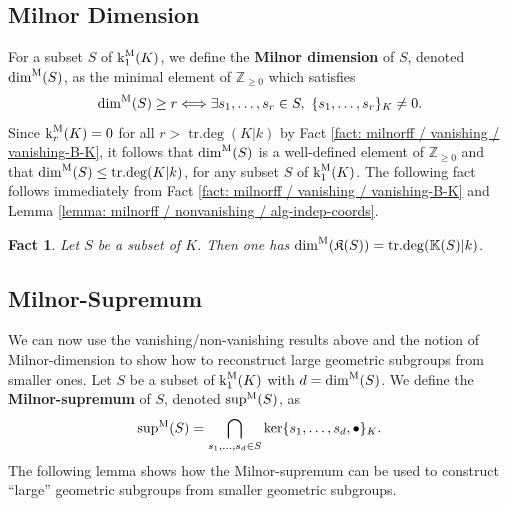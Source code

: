 \documentclass[11pt]{amsart}
\newtheorem{fact}[proposition]{Fact}
\theoremstyle{definition}
\theoremstyle{remark}
\numberwithin{equation}{section}
\DeclareMathOperator{\trdeg}{tr.deg}
\newcommand{\Z}{\mathbb{Z}}
\newcommand{\Kbb}{\mathbb{K}}
\newcommand{\Kfrak}{\mathfrak{K}}
\renewcommand{\k}{\operatorname{k}^{\rm M}}
\newcommand{\dimm}{\dim^{\rm M}}
\newcommand{\msup}{{\sup}^{\rm M}}
\begin{document}
\subsection{Milnor Dimension}
\label{subsection: milnorff / milnordim}

For a subset $S$ of $\k_1(K)$, we define the {\bf Milnor dimension} of $S$, denoted $\dimm(S)$, as the minimal element of $\Z_{\geq 0}$ which satisfies
\[ \dimm(S) \geq r \Longleftrightarrow \exists s_1,\ldots,s_r \in S, \ \{s_1,\ldots,s_r\}_K \neq 0. \]
Since $\k_r(K) = 0$ for all $r > \trdeg(K|k)$ by Fact \ref{fact: milnorff / vanishing / vanishing-B-K}, it follows that $\dimm(S)$ is a well-defined element of $\Z_{\geq 0}$ and that $\dimm(S) \leq \trdeg(K|k)$, for any subset $S$ of $\k_1(K)$.
The following fact follows immediately from Fact \ref{fact: milnorff / vanishing / vanishing-B-K} and Lemma \ref{lemma: milnorff / nonvanishing / alg-indep-coords}.

\begin{fact}
\label{fact: milnorff / milnordim / geometric-dim}
  Let $S$ be a subset of $K$.
  Then one has $\dimm(\Kfrak(S)) = \trdeg(\Kbb(S)|k)$.
\end{fact}

\subsection{Milnor-Supremum}
\label{subsection: milnorff / milnorsup}

We can now use the vanishing/non-vanishing results above and the notion of Milnor-dimension to show how to reconstruct large geometric subgroups from smaller ones.
Let $S$ be a subset of $\k_1(K)$ with $d = \dimm(S)$.
We define the {\bf Milnor-supremum} of $S$, denoted $\msup(S)$, as
\[ \msup(S) = \bigcap_{s_1,\ldots,s_d \in S} \ker\{s_1,\ldots,s_d,\bullet\}_K.\]
The following lemma shows how the Milnor-supremum can be used to construct ``large'' geometric subgroups from smaller geometric subgroups.
\end{document}

